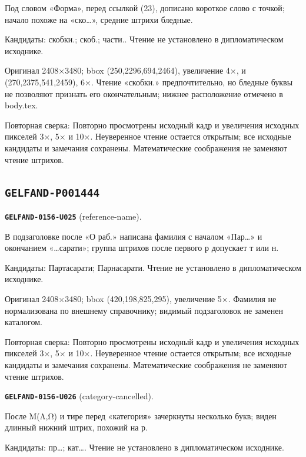 Под словом «Форма», перед ссылкой (23), дописано короткое слово с точкой; начало похоже на «ско…», средние штрихи бледные.\par
Кандидаты: скобки.; скоб.; части.. Чтение не установлено в дипломатическом исходнике.\par
Оригинал 2408×3480; bbox (250,2296,694,2464), увеличение 4×, и (270,2375,541,2459), 6×. Чтение «скобки.» предпочтительно, но бледные буквы не позволяют признать его окончательным; нижнее расположение отмечено в body.tex.\par
Повторная сверка: Повторно просмотрены исходный кадр и увеличения исходных пикселей 3×, 5× и 10×. Неуверенное чтение остается открытым; все исходные кандидаты и замечания сохранены. Математические соображения не заменяют чтение штрихов.\par\medskip
\subsection*{\texttt{GELFAND-P001444}}
\par\noindent\leavevmode{}\label{GELFAND-0156-U025}\label{GELFAND-P001444:reference-name}\textbf{\texttt{GELFAND-0156-U025}} (reference-name).\nopagebreak[4]\par
В подзаголовке после «О раб.» написана фамилия с началом «Пар…» и окончанием «…сарати»; группа штрихов после первого р допускает т или н.\par
Кандидаты: Партасарати; Парнасарати. Чтение не установлено в дипломатическом исходнике.\par
Оригинал 2408×3480; bbox (420,198,825,295), увеличение 5×. Фамилия не нормализована по внешнему справочнику; видимый подзаголовок не заменен каталогом.\par
Повторная сверка: Повторно просмотрены исходный кадр и увеличения исходных пикселей 3×, 5× и 10×. Неуверенное чтение остается открытым; все исходные кандидаты и замечания сохранены. Математические соображения не заменяют чтение штрихов.\par\medskip
\par\noindent\leavevmode{}\label{GELFAND-0156-U026}\label{GELFAND-P001444:category-cancelled}\textbf{\texttt{GELFAND-0156-U026}} (category-cancelled).\nopagebreak[4]\par
После M(Λ,Ω) и тире перед «категория» зачеркнуты несколько букв; виден длинный нижний штрих, похожий на р.\par
Кандидаты: пр…; кат…. Чтение не установлено в дипломатическом исходнике.\par
